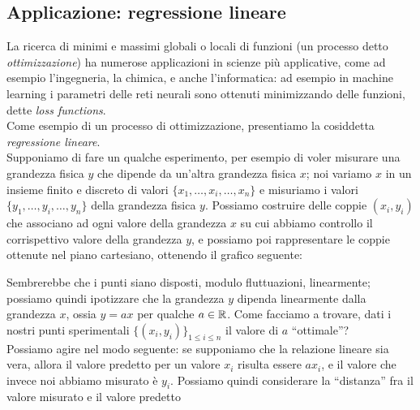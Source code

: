 \subsection{Applicazione: regressione lineare}
La ricerca di minimi e massimi globali o locali di funzioni (un processo detto \emph{ottimizzazione}) ha numerose applicazioni in scienze più applicative, come ad esempio l'ingegneria, la chimica, e anche l'informatica: ad esempio in machine learning i parametri delle reti neurali sono ottenuti minimizzando delle funzioni, dette \emph{loss functions}.\\
Come esempio di un processo di ottimizzazione, presentiamo la cosiddetta \emph{regressione lineare}.\\
Supponiamo di fare un qualche esperimento, per esempio di voler misurare una grandezza fisica $y$ che dipende da un'altra grandezza fisica $x$; noi variamo $x$ in un insieme finito e discreto di valori $\{x_1, \dots, x_i, \dots, x_n\}$ e misuriamo i valori $\{y_1, \dots, y_i, \dots, y_n\}$ della grandezza fisica $y$. Possiamo costruire delle coppie $(x_i, y_i)$ che associano ad ogni valore della grandezza $x$ su cui abbiamo controllo il corrispettivo valore della grandezza $y$, e possiamo poi rappresentare le coppie ottenute nel piano cartesiano, ottenendo il grafico seguente:
\begin{center}
\end{center}
Sembrerebbe che i punti siano disposti, modulo fluttuazioni, linearmente; possiamo quindi ipotizzare che la grandezza $y$ dipenda linearmente dalla grandezza $x$, ossia $y=ax$ per qualche $a\in\amsbb{R}$. Come facciamo a trovare, dati i nostri punti sperimentali $\{(x_i, y_i)\}_{1\le i\le n}$ il valore di $a$ ``ottimale''? \\
Possiamo agire nel modo seguente: se supponiamo che la relazione lineare sia vera, allora il valore predetto per un valore $x_i$ risulta essere $ax_i$, e il valore che invece noi abbiamo misurato è $y_i$. Possiamo quindi considerare la ``distanza'' fra il valore misurato e il valore predetto
